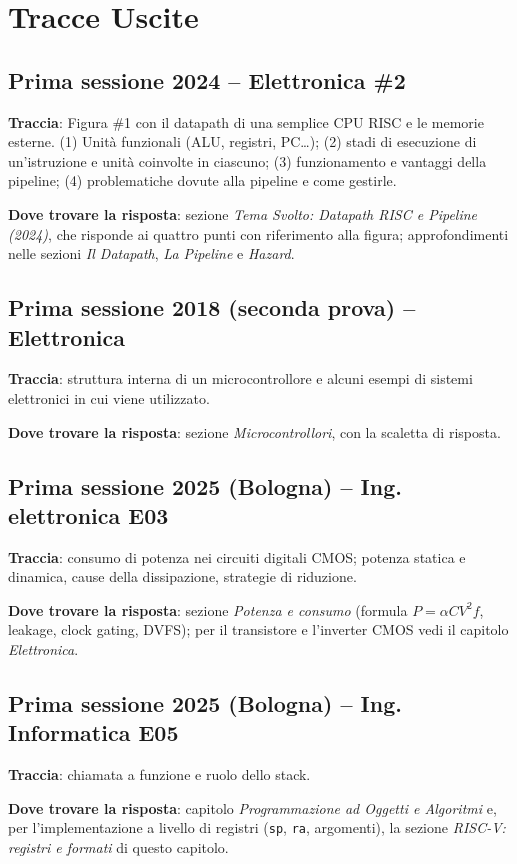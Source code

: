 
\section*{Tracce Uscite} %

\subsection*{Prima sessione 2024 -- Elettronica \#2}
\textbf{Traccia}: Figura \#1 con il datapath di una semplice CPU RISC e le memorie esterne. (1) Unità funzionali (ALU, registri, PC\ldots); (2) stadi di esecuzione di un'istruzione e unità coinvolte in ciascuno; (3) funzionamento e vantaggi della pipeline; (4) problematiche dovute alla pipeline e come gestirle.

\textbf{Dove trovare la risposta}: sezione \emph{Tema Svolto: Datapath RISC e Pipeline (2024)}, che risponde ai quattro punti con riferimento alla figura; approfondimenti nelle sezioni \emph{Il Datapath}, \emph{La Pipeline} e \emph{Hazard}.

\subsection*{Prima sessione 2018 (seconda prova) -- Elettronica}
\textbf{Traccia}: struttura interna di un microcontrollore e alcuni esempi di sistemi elettronici in cui viene utilizzato.

\textbf{Dove trovare la risposta}: sezione \emph{Microcontrollori}, con la scaletta di risposta.

\subsection*{Prima sessione 2025 (Bologna) -- Ing. elettronica E03}
\textbf{Traccia}: consumo di potenza nei circuiti digitali CMOS; potenza statica e dinamica, cause della dissipazione, strategie di riduzione.

\textbf{Dove trovare la risposta}: sezione \emph{Potenza e consumo} (formula $P = \alpha C V^2 f$, leakage, clock gating, DVFS); per il transistore e l'inverter CMOS vedi il capitolo \emph{Elettronica}.

\subsection*{Prima sessione 2025 (Bologna) -- Ing. Informatica E05}
\textbf{Traccia}: chiamata a funzione e ruolo dello stack.

\textbf{Dove trovare la risposta}: capitolo \emph{Programmazione ad Oggetti e Algoritmi} e, per l'implementazione a livello di registri (\texttt{sp}, \texttt{ra}, argomenti), la sezione \emph{RISC-V: registri e formati} di questo capitolo.
